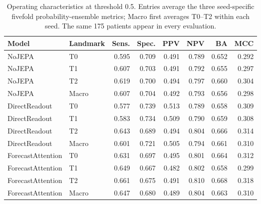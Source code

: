 \begin{table}[t]
\centering
\small
\caption{Operating characteristics at threshold 0.5. Entries average the three seed-specific fivefold probability-ensemble metrics; Macro first averages T0--T2 within each seed. The same 175 patients appear in every evaluation.}
\label{tab:extended_operating}
\begin{tabular}{llrrrrrr}
\toprule
Model & Landmark & Sens. & Spec. & PPV & NPV & BA & MCC \\
\midrule
NoJEPA & T0 & 0.595 & 0.709 & 0.491 & 0.789 & 0.652 & 0.292 \\
NoJEPA & T1 & 0.607 & 0.703 & 0.491 & 0.792 & 0.655 & 0.297 \\
NoJEPA & T2 & 0.619 & 0.700 & 0.494 & 0.797 & 0.660 & 0.304 \\
NoJEPA & Macro & 0.607 & 0.704 & 0.492 & 0.793 & 0.656 & 0.298 \\
\midrule
DirectReadout & T0 & 0.577 & 0.739 & 0.513 & 0.789 & 0.658 & 0.309 \\
DirectReadout & T1 & 0.583 & 0.734 & 0.509 & 0.790 & 0.659 & 0.308 \\
DirectReadout & T2 & 0.643 & 0.689 & 0.494 & 0.804 & 0.666 & 0.314 \\
DirectReadout & Macro & 0.601 & 0.721 & 0.505 & 0.794 & 0.661 & 0.310 \\
\midrule
ForecastAttention & T0 & 0.631 & 0.697 & 0.495 & 0.801 & 0.664 & 0.312 \\
ForecastAttention & T1 & 0.649 & 0.667 & 0.482 & 0.802 & 0.658 & 0.299 \\
ForecastAttention & T2 & 0.661 & 0.675 & 0.491 & 0.810 & 0.668 & 0.318 \\
ForecastAttention & Macro & 0.647 & 0.680 & 0.489 & 0.804 & 0.663 & 0.310 \\
\bottomrule
\end{tabular}
\end{table}
